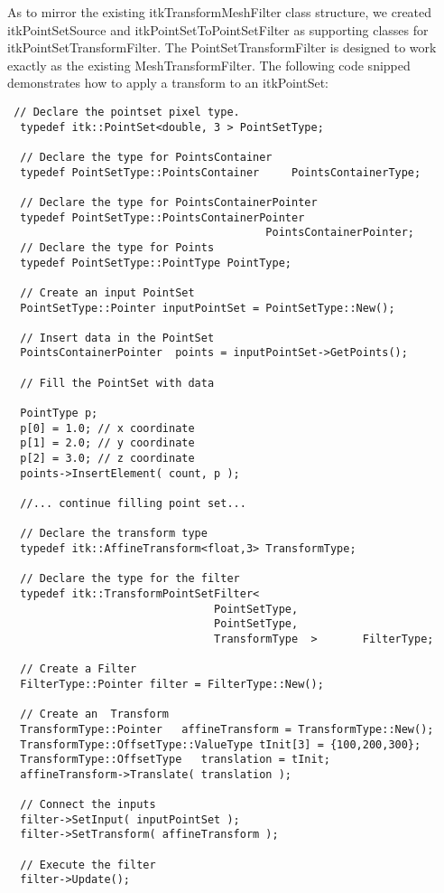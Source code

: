 \documentclass{InsightArticle}
\begin{document}
As to mirror the existing itkTransformMeshFilter class structure, we created itkPointSetSource and itkPointSetToPointSetFilter as supporting classes for itkPointSetTransformFilter. The PointSetTransformFilter is designed to work exactly as the existing MeshTransformFilter. The following code snipped demonstrates how to apply a transform to an itkPointSet:
\small
\begin{verbatim}
 // Declare the pointset pixel type.
  typedef itk::PointSet<double, 3 > PointSetType;

  // Declare the type for PointsContainer
  typedef PointSetType::PointsContainer     PointsContainerType;

  // Declare the type for PointsContainerPointer
  typedef PointSetType::PointsContainerPointer     
                                        PointsContainerPointer;
  // Declare the type for Points
  typedef PointSetType::PointType PointType;

  // Create an input PointSet
  PointSetType::Pointer inputPointSet = PointSetType::New();

  // Insert data in the PointSet
  PointsContainerPointer  points = inputPointSet->GetPoints();

  // Fill the PointSet with data
  
  PointType p;
  p[0] = 1.0; // x coordinate
  p[1] = 2.0; // y coordinate
  p[2] = 3.0; // z coordinate
  points->InsertElement( count, p );

  //... continue filling point set...
  
  // Declare the transform type
  typedef itk::AffineTransform<float,3> TransformType;

  // Declare the type for the filter
  typedef itk::TransformPointSetFilter<
                                PointSetType,
                                PointSetType,
                                TransformType  >       FilterType;

  // Create a Filter
  FilterType::Pointer filter = FilterType::New();

  // Create an  Transform 
  TransformType::Pointer   affineTransform = TransformType::New();
  TransformType::OffsetType::ValueType tInit[3] = {100,200,300};
  TransformType::OffsetType   translation = tInit;
  affineTransform->Translate( translation );

  // Connect the inputs
  filter->SetInput( inputPointSet ); 
  filter->SetTransform( affineTransform ); 

  // Execute the filter
  filter->Update();
\end{verbatim}


\normalsize
\end{document}
